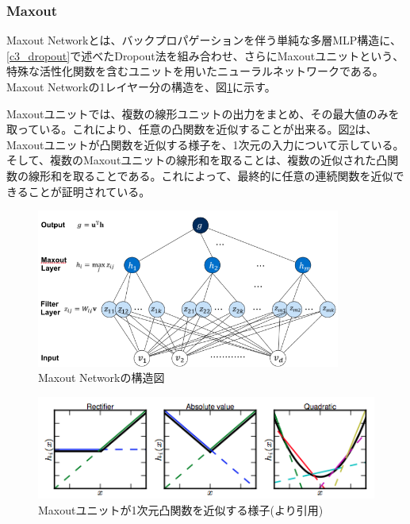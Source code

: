 \subsubsection{Maxout}
Maxout Networkとは、バックプロパゲーションを伴う単純な多層MLP構造に、\ref{c3_dropout}で述べたDropout法を組み合わせ、さらにMaxoutユニットという、特殊な活性化関数を含むユニットを用いたニューラルネットワークである\cite{goodfellow2013maxout}。Maxout Networkの1レイヤー分の構造を、図\ref{c3_maxout_arch}に示す。\par
Maxoutユニットでは、複数の線形ユニットの出力をまとめ、その最大値のみを取っている。これにより、任意の凸関数を近似することが出来る。図\ref{c3_maxout_app}は、Maxoutユニットが凸関数を近似する様子を、1次元の入力について示している。そして、複数のMaxoutユニットの線形和を取ることは、複数の近似された凸関数の線形和を取ることである。これによって、最終的に任意の連続関数を近似できることが証明されている。%
\begin{figure}[tbp]
 \begin{center}
  \includegraphics[width=100mm]{img/c3/maxout_arch}
 \end{center}
 \caption{Maxout Networkの構造図}
 \label{c3_maxout_arch}
\end{figure}
\begin{figure}[tbp]
 \begin{center}
  \includegraphics[width=130mm]{img/c3/maxout_app}
 \end{center}
 \caption{Maxoutユニットが1次元凸関数を近似する様子(\cite{goodfellow2013maxout}より引用)}
 \label{c3_maxout_app}
\end{figure}

